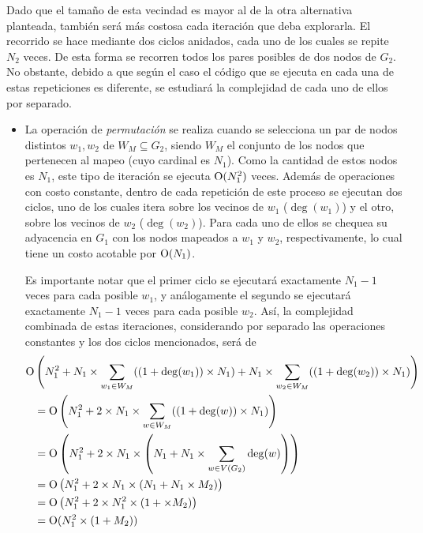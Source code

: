 
Dado que el tamaño de esta vecindad es mayor al de la otra alternativa
planteada, también será más costosa cada iteración que deba explorarla. El
recorrido se hace mediante dos ciclos anidados, cada uno de los cuales se
repite $N_2$ veces. De esta forma se recorren todos los pares posibles de
dos nodos de $G_2$. No obstante, debido a que según el caso el código que se
ejecuta en cada una de estas repeticiones es diferente, se estudiará la
complejidad de cada uno de ellos por separado.

\begin{itemize}
    \item La operación de \emph{permutación} se realiza cuando se
    selecciona un par de nodos distintos $w_1, w_2$ de $W_M \subseteq G_2$,
    siendo $W_M$ el conjunto de los nodos que pertenecen al mapeo (cuyo
    cardinal es $N_1$). Como la cantidad de estos nodos es $N_1$, este tipo de
    iteración se ejecuta $\operatorname{O}(N_1^2)$ veces. Además de operaciones con costo
    constante, dentro de cada repetición de este proceso se ejecutan dos
    ciclos, uno de los cuales itera sobre los vecinos de $w_1$ ($\deg(w_1)$) y
    el otro, sobre los vecinos de $w_2$ ($\deg(w_2)$). Para cada uno de ellos
    se chequea su adyacencia en $G_1$ con los nodos mapeados a $w_1$ y $w_2$,
    respectivamente, lo cual tiene un costo acotable por $\operatorname{O}(N_1)$.

    Es importante notar que el primer ciclo se ejecutará exactamente $N_1 - 1$
    veces para cada posible $w_1$, y análogamente el segundo se ejecutará
    exactamente $N_1 - 1$ veces para cada posible $w_2$. Así, la complejidad
    combinada de estas iteraciones, considerando por separado las operaciones
    constantes y los dos ciclos mencionados, será de
    \begin{align*}
    \operatorname{O} & \left( N_1^2 + N_1 \times \sum_{w_1 \in W_M} ((1 +
    \deg(w_1)) \times N_1) + N_1 \times \sum_{w_2 \in W_M} ((1 + \deg(w_2))
    \times N_1) \right) \\
    &= \operatorname{O} \left( N_1^2 + 2 \times N_1 \times \sum_{w \in W_M} ((1 +
    \deg(w)) \times N_1) \right) \\
    &= \operatorname{O} \left( N_1^2 + 2 \times N_1 \times \left( N_1 + N_1 \times \sum_{w
    \in V(G_2)} \deg(w) \right) \right) \\
    &= \operatorname{O} \left( N_1^2 + 2 \times N_1 \times \left( N_1 + N_1 \times M_2
    \right) \right) \\
    &= \operatorname{O} \left( N_1^2 + 2 \times N_1^2 \times \left( 1 + \times M_2
    \right) \right) \\
    &= \operatorname{O} (N_1^2 \times (1 + M_2))
    \end{align*}


\end{itemize}
